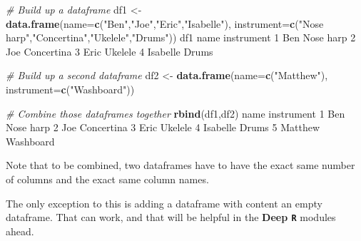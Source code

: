 \documentclass[
]{book}
\newenvironment{Shaded}{\begin{snugshade}}{\end{snugshade}}
\newcommand{\AttributeTok}[1]{\textcolor[rgb]{0.13,0.29,0.53}{#1}}
\newcommand{\CommentTok}[1]{\textcolor[rgb]{0.56,0.35,0.01}{\textit{#1}}}
\newcommand{\DecValTok}[1]{\textcolor[rgb]{0.00,0.00,0.81}{#1}}
\newcommand{\FunctionTok}[1]{\textcolor[rgb]{0.13,0.29,0.53}{\textbf{#1}}}
\newcommand{\NormalTok}[1]{#1}
\newcommand{\OtherTok}[1]{\textcolor[rgb]{0.56,0.35,0.01}{#1}}
\newcommand{\StringTok}[1]{\textcolor[rgb]{0.31,0.60,0.02}{#1}}
\begin{document}
\begin{Shaded}
\begin{Highlighting}[]
\CommentTok{\# Build up a dataframe}
\NormalTok{df1 }\OtherTok{\textless{}{-}} \FunctionTok{data.frame}\NormalTok{(}\AttributeTok{name=}\FunctionTok{c}\NormalTok{(}\StringTok{"Ben"}\NormalTok{,}\StringTok{"Joe"}\NormalTok{,}\StringTok{"Eric"}\NormalTok{,}\StringTok{"Isabelle"}\NormalTok{),}
                  \AttributeTok{instrument=}\FunctionTok{c}\NormalTok{(}\StringTok{"Nose harp"}\NormalTok{,}\StringTok{"Concertina"}\NormalTok{,}\StringTok{"Ukelele"}\NormalTok{,}\StringTok{"Drums"}\NormalTok{))}
\NormalTok{df1}
\NormalTok{      name instrument}
\DecValTok{1}\NormalTok{      Ben  Nose harp}
\DecValTok{2}\NormalTok{      Joe Concertina}
\DecValTok{3}\NormalTok{     Eric    Ukelele}
\DecValTok{4}\NormalTok{ Isabelle      Drums}
\end{Highlighting}
\end{Shaded}

\begin{Shaded}
\begin{Highlighting}[]
\CommentTok{\# Build up a second dataframe}
\NormalTok{df2 }\OtherTok{\textless{}{-}} \FunctionTok{data.frame}\NormalTok{(}\AttributeTok{name=}\FunctionTok{c}\NormalTok{(}\StringTok{"Matthew"}\NormalTok{),}
                  \AttributeTok{instrument=}\FunctionTok{c}\NormalTok{(}\StringTok{"Washboard"}\NormalTok{))}
\end{Highlighting}
\end{Shaded}

\begin{Shaded}
\begin{Highlighting}[]
\CommentTok{\# Combine those dataframes together}
\FunctionTok{rbind}\NormalTok{(df1,df2)}
\NormalTok{      name instrument}
\DecValTok{1}\NormalTok{      Ben  Nose harp}
\DecValTok{2}\NormalTok{      Joe Concertina}
\DecValTok{3}\NormalTok{     Eric    Ukelele}
\DecValTok{4}\NormalTok{ Isabelle      Drums}
\DecValTok{5}\NormalTok{  Matthew  Washboard}
\end{Highlighting}
\end{Shaded}

Note that to be combined, two dataframes have to have the exact same number of columns and the exact same column names.

The only exception to this is adding a dataframe with content an empty dataframe. That can work, and that will be helpful in the \textbf{Deep \texttt{R}} modules ahead.
\end{document}
